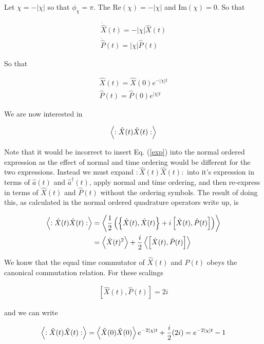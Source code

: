 \documentclass[12pt]{article}
\begin{document}
Let $\chi = -|\chi|$ so that $\phi_{\chi} = \pi$. The $\text{Re}(\chi) = -|\chi|$ and $\text{Im}(\chi) = 0$. So that

\begin{align}
\dot{\hat{X}}(t) = -|\chi| \hat{X}(t)\\
\dot{\hat{P}}(t) = |\chi| \hat{P}(t)
\end{align}

So that

\begin{align}
\label{exp}
\hat{X}(t) = \hat{X}(0) e^{-|\chi| t}\\
\hat{P}(t) = \hat{P}(0) e^{|\chi| t}
\end{align}

We are now interested in

\begin{align}
\Braket{:\hat{X}(t) \hat{X}(t):}
\end{align}

Note that it would be incorrect to insert Eq. (\ref{exp}) into the normal ordered expression as the effect of normal and time ordering would be different for the two expressions. Instead we must expand $:\hat{X}(t) \hat{X}(t):$ into it's expression in terms of $\hat{a}(t)$ and $\hat{a}^{\dag}(t)$, apply normal and time ordering, and then re-express in terms of $\hat{X}(t)$ and $\hat{P}(t)$ without the ordering symbols. The result of doing this, as calculated in the normal ordered quadrature operators write up, is 

\begin{align}
\Braket{:\hat{X}(t) \hat{X}(t):} &= \Braket{\frac{1}{2} \left(\left\{\hat{X}(t), \hat{X}(t) \right\} + i \left[\hat{X}(t),\hat{P}(t) \right] \right)}\\
&= \Braket{\hat{X}(t)^2} + \frac{i}{2} \Braket{\left[\hat{X}(t), \hat{P}(t) \right]}
\end{align}

We konw that the equal time commutator of $\hat{X}(t)$ and $\hat{P}(t)$ obeys the canonical commutation relation. For these scalings

\begin{align}
\left[\hat{X}(t),\hat{P}(t)\right] = 2i
\end{align}

and we can write

\begin{align}
\Braket{:\hat{X}(t)\hat{X}(t):} = \Braket{\hat{X}(0)\hat{X}(0)} e^{-2|\chi|t} + \frac{i}{2}(2i) = e^{-2|\chi|t} - 1
\end{align}
\end{document}
